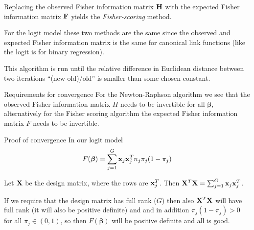 \documentclass[
  ignorenonframetext,
]{beamer}
\begin{document}
\begin{frame}
Replacing the observed Fisher information matrix \({\bf H}\) with the
expected Fisher information matrix \({\bf F}\) yields the
\emph{Fisher-scoring} method.

For the logit model these two methods are the same since the observed
and expected Fisher information matrix is the same for canonical link
functions (like the logit is for binary regression).

This algorithm is run until the relative difference in Euclidean
distance between two iterations ``(new-old)/old'' is smaller than some
chosen constant.
\end{frame}

\begin{frame}
\begin{block}{Requirements for convergence}
\protect\hypertarget{requirements-for-convergence}{}
For the Newton-Raphson algorithm we see that the observed Fisher
information matrix \(H\) needs to be invertible for all
\(\boldsymbol{\beta}\), alternatively for the Fisher scoring algorithm
the expected Fisher information matrix \(F\) needs to be invertible.
\end{block}
\end{frame}

\begin{frame}
\begin{block}{Proof of convergence}
\protect\hypertarget{proof-of-convergence}{}
In our logit model
\[F(\boldsymbol{\beta})=\sum_{j=1}^G {\bf x}_j {\bf x}_j^T n_j \pi_j (1-\pi_j)\]

Let \({\bf X}\) be the design matrix, where the rows are
\({\bf x}_j^T\). Then
\({\bf X}^T{\bf X}=\sum_{j=1}^G {\bf x}_j {\bf x}_j^T\).

If we require that the design matrix has full rank (\(G\)) then also
\({\bf X}^T{\bf X}\) will have full rank (it will also be positive
definite) and and in addition \(\pi_j(1-\pi_j)>0\) for all
\(\pi_j \in (0,1)\), so then \(F(\boldsymbol{\beta})\) will be positive
definite and all is good.
\end{block}
\end{frame}
\end{document}
